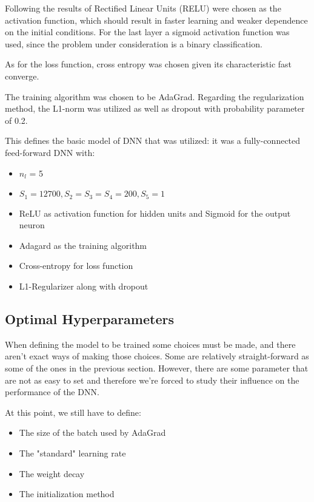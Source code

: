 Following the results of \cite{glorot2011deep} Rectified Linear Units (RELU) were chosen as the activation function, which should result in faster learning and weaker dependence on the initial conditions. For the last layer a sigmoid activation function was used, since the problem under consideration is a binary classification.

As for the loss function, cross entropy was chosen given its characteristic fast converge.

The training algorithm was chosen to be AdaGrad.
Regarding the regularization method, the L1-norm was utilized as well as dropout with probability parameter of 0.2.

This defines the basic model of DNN that was utilized: it was a fully-connected feed-forward DNN with:
\begin{itemize}
\item $n_l$ = 5
\item $S_1 = 12700, S_2=S_3=S_4 = 200, S_5=1$
\item ReLU as activation function for hidden units and Sigmoid for the output neuron
\item Adagard as the training algorithm
\item Cross-entropy for loss function
\item L1-Regularizer along with dropout
\end{itemize}

\subsection{Optimal Hyperparameters}
\label{subsec:hyperparameters}

When defining the model to be trained some choices must be made, and there aren't exact ways of making those choices. Some are relatively straight-forward as some of the ones in the previous section. However, there are some parameter that are not as easy to set and therefore we're forced to study their influence on the performance of the DNN.

At this point, we still have to define:
\begin{itemize}
\item The size of the batch used by AdaGrad
\item The "standard" learning rate
\item The weight decay
\item The initialization method
\end{itemize}

